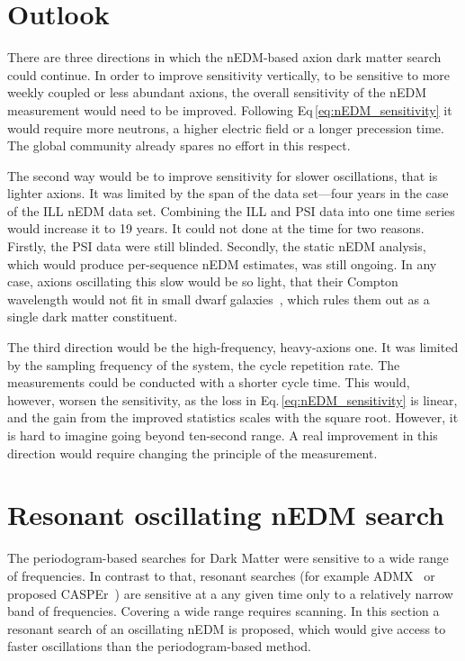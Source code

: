 \section{Outlook}
There are three directions in which the nEDM-based axion dark matter search could continue.
In order to improve sensitivity vertically, to be sensitive to more weekly coupled or less abundant axions, the overall sensitivity of the nEDM measurement would need to be improved. Following Eq\,\ref{eq:nEDM_sensitivity} it would require more neutrons, a higher electric field or a longer precession time.
The global community already spares no effort in this respect.

The second way would be to improve sensitivity for slower oscillations, that is  lighter axions. It was limited by the span of the data set---four years in the case of the ILL nEDM data set. Combining the ILL and PSI data into one time series would increase it to 19 years. It could not done at the time for two reasons. Firstly, the PSI data were still blinded. Secondly, the static nEDM analysis, which would produce per-sequence nEDM estimates, was still ongoing. In any case, axions oscillating this slow would be so light, that their Compton wavelength would not fit in small dwarf galaxies~\cite{Marsh2015Review}, which rules them out as a single dark matter constituent.

The third direction would be the high-frequency, heavy-axions one. It was limited by the sampling frequency of the system, the cycle repetition rate.
The measurements could be conducted with a shorter cycle time. This would, however, worsen the sensitivity, as the loss in Eq.\,\ref{eq:nEDM_sensitivity} is linear, and the gain from the improved statistics scales with the square root.
However, it is hard to imagine going beyond ten-second range. A real improvement in this direction would require changing the principle of the measurement.




\section{Resonant oscillating nEDM search}
The periodogram-based searches for Dark Matter were sensitive to a wide range of frequencies. In contrast to that, resonant searches (for example ADMX~\cite{PhysRevLett.104.041301} or proposed CASPEr~\cite{CASPEr2014}) are sensitive at a any given time only to a relatively narrow band of frequencies. Covering a wide range requires scanning. In this section a resonant search of an oscillating nEDM is proposed, which would give access to faster oscillations than the periodogram-based method.

